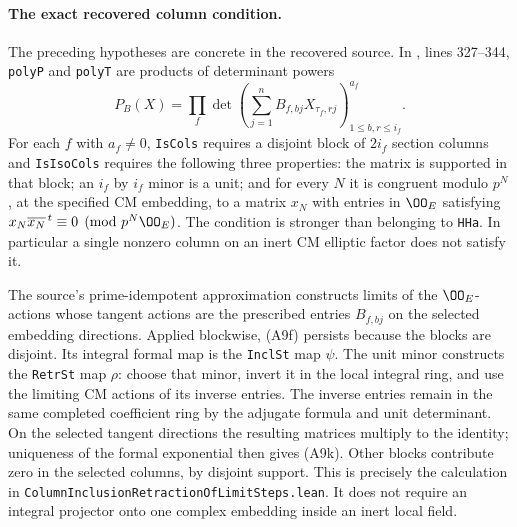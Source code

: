 \documentclass[11pt]{article}
\theoremstyle{definition}\newtheorem{definition}[theorem]{Definition}\newtheorem{remark}[theorem]{Remark}
\begin{document}
\paragraph{The exact recovered column condition.}
The preceding hypotheses are concrete in the recovered source.
In
,
lines 327--344, \texttt{polyP} and \texttt{polyT} are products
of determinant powers
\[
 P_B(X)=\prod_f
   \det\left(\sum_{j=1}^n B_{f,bj}X_{\tau_f,rj}
                    \right)_{1\leq b,r\leq i_f}^{a_f}.
 \tag{A9n}
\]
For each $f$ with $a_f\ne0$, \texttt{IsCols} requires a
disjoint block of $2i_f$ section columns and
\texttt{IsIsoCols} requires the following three properties:
the matrix is supported in that block; an $i_f$ by $i_f$
minor is a unit; and for every $N$ it is congruent modulo
$p^N$, at the specified CM embedding, to a matrix
$x_N$ with entries in $\OO_E$ satisfying
$x_N\overline{x_N}^{\,t}\equiv0\pmod{p^N\OO_E}$.
The condition is stronger than belonging to \texttt{HHa}.
In particular a single nonzero column on an inert CM
elliptic factor does not satisfy it.

The source's prime-idempotent approximation constructs
limits of the $\OO_E$-actions whose tangent actions are the
prescribed entries $B_{f,bj}$ on the selected embedding
directions.  Applied blockwise, (A9f) persists because the
blocks are disjoint.  Its integral formal map is the
\texttt{InclSt} map $\psi$.
The unit minor constructs the \texttt{RetrSt} map $\rho$:
choose that minor, invert it in the local integral ring,
and use the limiting CM actions of its inverse entries.
The inverse entries remain in the same completed coefficient
ring by the adjugate formula and unit determinant.  On the
selected tangent directions the resulting matrices multiply
to the identity; uniqueness of the formal exponential then
gives (A9k).  Other blocks contribute zero in the selected
columns, by disjoint support.  This is precisely the
calculation in
\nolinkurl{ColumnInclusionRetractionOfLimitSteps.lean}.
It does not require an integral projector onto one complex
embedding inside an inert local field.
\end{document}
